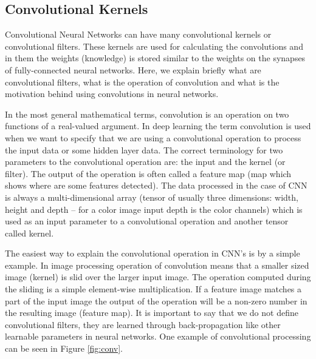 \documentclass[b5paper]{book}
\begin{document}
\subsection{Convolutional Kernels}

Convolutional Neural Networks can have many convolutional kernels or convolutional filters. These kernels are used for calculating the convolutions and in them the weights (knowledge) is stored similar to the weights on the synapses of fully-connected neural networks. Here, we explain briefly what are convolutional filters, what is the operation of convolution and what is the motivation behind using convolutions in neural networks.

In the most general mathematical terms, convolution is an operation on two functions of a real-valued argument. In deep learning the term convolution is used when we want to specify that we are using a convolutional operation to process the input data or some hidden layer data. The correct terminology for two parameters to the convolutional operation are: the input and the kernel (or filter). The output of the operation is often called a feature map (map which shows where are some features detected). The data processed in the case of CNN is always a multi-dimensional array (tensor of usually three dimensions: width, height and depth -- for a color image input depth is the color channels) which is used as an input parameter to a convolutional operation and another tensor called kernel. 

The easiest way to explain the convolutional operation in CNN's is by a simple example. In image processing operation of convolution means that a smaller sized image (kernel) is slid over the larger input image. The operation computed during the sliding is a simple element-wise multiplication. If a feature image matches a part of the input image the output of the operation will be a non-zero number in the resulting image (feature map). It is important to say that we do not define convolutional filters, they are learned through back-propagation like other learnable parameters in neural networks. One example of convolutional processing can be seen in Figure \ref{fig:conv}.
\end{document}
